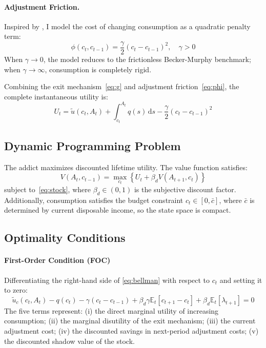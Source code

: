 \documentclass[12pt]{article}
\begin{document}
\paragraph{Adjustment Friction.} Inspired by \cite{Fuhrer2000}, I model the cost of changing consumption as a quadratic
penalty term:
\begin{equation}\label{eq:phi}
\phi(c_t, c_{t-1}) = \frac{\gamma}{2}(c_t - c_{t-1})^2, \quad \gamma > 0
\end{equation}
When $\gamma \to 0$, the model reduces to the frictionless Becker-Murphy benchmark; when $\gamma \to \infty$, consumption is completely rigid.

Combining the exit mechanism~\eqref{eq:g} and adjustment friction~\eqref{eq:phi}, the complete instantaneous utility is:
\begin{equation}\label{eq:full_utility}
U_t = \tilde{u}(c_t, A_t)
    + \int_{c_t}^{A_t} q(s)\,\mathrm{d}s
    - \frac{\gamma}{2}(c_t - c_{t-1})^2
\end{equation}

\subsection{Dynamic Programming Problem}

The addict maximizes discounted lifetime utility. The value function satisfies:
\begin{equation}\label{eq:bellman}
V(A_t, c_{t-1}) = \max_{c_t}\left\{U_t + \beta_d V(A_{t+1}, c_t)\right\}
\end{equation}
subject to~\eqref{eq:stock}, where $\beta_d \in (0,1)$ is the subjective discount factor. Additionally, consumption satisfies the budget
constraint $c_t \in [0, \bar{c}]$, where $\bar{c}$ is determined by current disposable income, so the state space is compact.

\subsection{Optimality Conditions}

\paragraph{First-Order Condition (FOC)}
 Differentiating the right-hand side of \eqref{eq:bellman} with respect to $c_t$ and setting it to zero:
\begin{equation}
    \tilde{u}_c(c_t, A_t) - q(c_t)
    - \gamma(c_t - c_{t-1})
    + \beta_d \gamma \mathbb{E}_t[c_{t+1} - c_t]
    + \beta_d \mathbb{E}_t[\lambda_{t+1}] = 0
    \label{eq:foc}
\end{equation}
The five terms represent: (i) the direct marginal utility of increasing consumption; (ii) the marginal disutility of the exit mechanism;
(iii) the current adjustment cost; (iv) the discounted savings in next-period adjustment costs; (v) the discounted shadow value of the stock.
 
\end{document}
